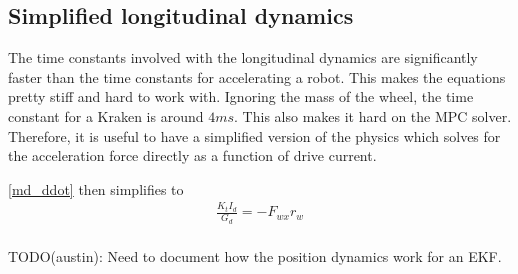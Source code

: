 \documentclass{article}
\begin{document}
\subsection{Simplified longitudinal dynamics}

The time constants involved with the longitudinal dynamics are significantly faster than the time constants for accelerating a robot.
This makes the equations pretty stiff and hard to work with.
Ignoring the mass of the wheel, the time constant for a Kraken is around $4ms$.
This also makes it hard on the MPC solver.  Therefore, it is useful to have a simplified version of the physics which solves for the acceleration force directly as a function of drive current.

\eqref{md_ddot} then simplifies to 
\begin{gather}
\frac{K_{t}I_d}{G_d} = -F_{wx}r_w\\
\end{gather}

TODO(austin): Need to document how the position dynamics work for an EKF.

\newpage
\printbibliography
\end{document}
